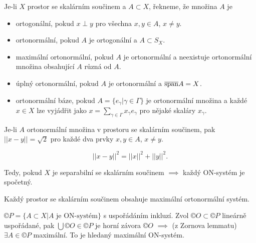 \documentclass[12pt]{article}					%
\begin{document}
\begin{definice}
	Je-li $X$ prostor se skalárním součinem a $A \subset X$, řekneme, že množina $A$ je

	\begin{itemize}
		\item ortogonální, pokud $x \perp y$ pro všechna $x, y \in A$, $x ≠ y$.
		\item ortonormální, pokud $A$ je ortogonální a $A \subset S_X$.
		\item maximální ortonormální, pokud $A$ je ortonormální a neexistuje ortonormální množina obsahující $A$ různá od $A$.
		\item úplný ortonormální, pokud $A$ je ortonormální a $\overline{\operatorname{span}} A = X$.
		\item ortonormální báze, pokud $A = \{e_\gamma | \gamma \in \Gamma\}$ je ortonormální množina a každé $x \in X$ lze vyjádřit jako $x = \sum_{\gamma \in \Gamma}x_\gamma e_\gamma$ pro nějaké skaláry $x_\gamma$.
	\end{itemize}
\end{definice}

\begin{tvrzeni}[Fakt]
	Je-li $A$ ortonormální množina v prostoru se skalárním součinem, pak $||x - y|| = \sqrt{2}$ pro každé dva prvky $x, y \in A$, $x ≠ y$.

	\begin{dukazin}
		$$ ||x - y||^2 = ||x||^2 + ||y||^2. $$
	\end{dukazin}

	\begin{poznamkain}
		Tedy, pokud $X$ je separabilní se skalárním součinem $\implies$ každý ON-systém je spočetný.
	\end{poznamkain}
\end{tvrzeni}

\begin{veta}
	Každý prostor se skalárním součinem obsahuje maximální ortonormální systém.

	\begin{dukazin}
		$©P = \{A \subset X | A \text{ je ON-systém}\}$ s uspořádáním inkluzí. Zvol $©O \subset ©P$ lineárně uspořádané, pak $\bigcup ©O \in ©P$ je horní závora $©O$ $\implies$ (z Zornova lemmatu) $\exists A \in ©P$ maximální. To je hledaný maximální ON-systém.
	\end{dukazin}
\end{veta}
\end{document}
